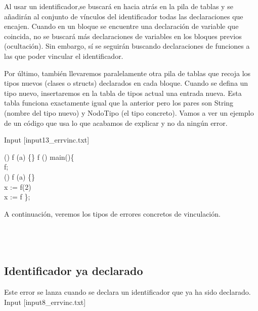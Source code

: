 Al usar un identificador,se buscará en hacia atrás en la pila de tablas y se añadirán al conjunto de vínculos del
identificador todas las declaraciones que encajen. Cuando en un bloque se encuentre una declaración de variable que
coincida, no se buscará más declaraciones de variables en los bloques previos (ocultación). Sin embargo, sí se seguirán buscando
declaraciones de funciones a las que poder vincular el identificador.

Por último, también llevaremos paralelamente otra pila de tablas que recoja los tipos nuevos (clases o structs) declarados en cada
bloque. Cuando se defina un tipo nuevo, insertaremos en la tabla de tipos actual una entrada nueva. Esta tabla funciona
exactamente igual que la anterior pero los pares son String (nombre del tipo nuevo) y NodoTipo (el tipo concreto). 
\newpage
Vamos a ver un ejemplo de un código que usa lo que acabamos de explicar y no da ningún error.

Input [input13\_errvinc.txt]

\begin{algorithm}
	\Integer{}(\Integer{}) f (a) \{\}\;
	\Boolean{} f\;
	\Integer{}() main()\{\\
		\quad \Integer{} f; \\
		\quad \Integer{}(\Boolean{}) f (a) \{\}\;
		\quad {}\\
		\quad \Integer{} x := f(2)\;
		\quad {}\\
		\quad x := f\;
	\};
\end{algorithm}

A continuación, veremos los tipos de errores concretos de vinculación. \\ \\ \\ \\
\newpage
\subsection{Identificador ya declarado}

Este error se lanza cuando se declara un identificador que ya ha sido declarado. \\

Input [input8\_errvinc.txt]

